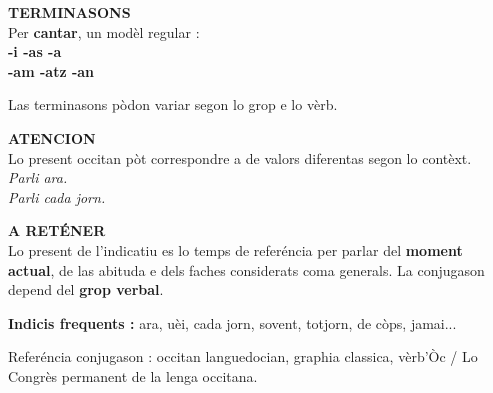 \documentclass[a4paper,11pt]{article}
\begin{document}
\begin{minipage}{0.91\textwidth}
\vspace{2mm}
\begin{minipage}{0.485\textwidth}
\begin{greenbox}[height=3.25cm]
\textbf{\color{GreenDark}TERMINASONS}\\[1mm]
Per \textbf{cantar}, un modèl regular :\\[1mm]
\centering
\textbf{-i \quad -as \quad -a}\\
\textbf{-am \quad -atz \quad -an}\\[1mm]
\raggedright
Las terminasons pòdon variar segon lo grop e lo vèrb.
\end{greenbox}
\end{minipage}\hfill
\begin{minipage}{0.485\textwidth}
\begin{warnbox}[height=3.25cm]
\textbf{\color{Red}ATENCION}\\[1mm]
Lo present occitan pòt correspondre a de valors diferentas segon lo contèxt.\\[1mm]
\textit{Parli ara.}\\
\textit{Parli cada jorn.}
\end{warnbox}
\end{minipage}

\vspace{2mm}
\begin{greenbox}
\textbf{\color{GreenDark}A RETÉNER}\\[1mm]
Lo present de l'indicatiu es lo temps de referéncia per parlar del \textbf{moment actual},
de las abituda e dels faches considerats coma generals. La conjugason depend del \textbf{grop verbal}.
\end{greenbox}

\vspace{1.5mm}\centering
{\small\color{Grey}\textbf{Indicis frequents :} ara, uèi, cada jorn, sovent, totjorn, de còps, jamai...}

\vspace{1mm}
{\scriptsize\color{Grey}Referéncia conjugason : occitan languedocian, graphia classica, vèrb'Òc / Lo Congrès permanent de la lenga occitana.}

\end{minipage}
\end{document}
